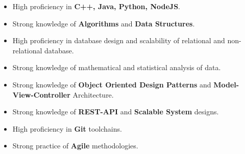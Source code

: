 \documentclass[12pt]{article} %
\begin{document}
\begin{paracol}{2}




	
	
	
	
	
	
	
	

\begin{itemize}
	\item High proficiency in \textbf{C++, Java, Python, NodeJS}.
	\item Strong knowledge of \textbf{Algorithms} and \textbf{Data Structures}.
	\item High proficiency in database design and scalability of relational and non-relational database.
	\item Strong knowledge of mathematical and statistical analysis of data.
	\item Strong knowledge of \textbf{Object Oriented Design Patterns} and \textbf{Model-View-Controller} Architecture.
	\item Strong knowledge of \textbf{REST-API} and \textbf{Scalable System} designs.
	\item High proficiency in \textbf{Git} toolchains.
	\item Strong practice of \textbf{Agile} methodologies.
\end{itemize}	


\end{paracol}
\end{document}
